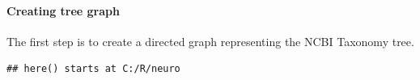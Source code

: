 \hypertarget{creating-tree-graph}{%
\paragraph{\texorpdfstring{Creating tree graph\\
}{Creating tree graph }}\label{creating-tree-graph}}

The first step is to create a directed graph representing the NCBI
Taxonomy tree.

\begin{Shaded}
\begin{Highlighting}[]
\OperatorTok{::}\OperatorTok{$}\NormalTok{(}
   \NormalTok{,}
   \NormalTok{,}
  \CommentTok{#,}
\NormalTok{)}

\end{Highlighting}
\end{Shaded}

\begin{verbatim}
## here() starts at C:/R/neuro
\end{verbatim}

